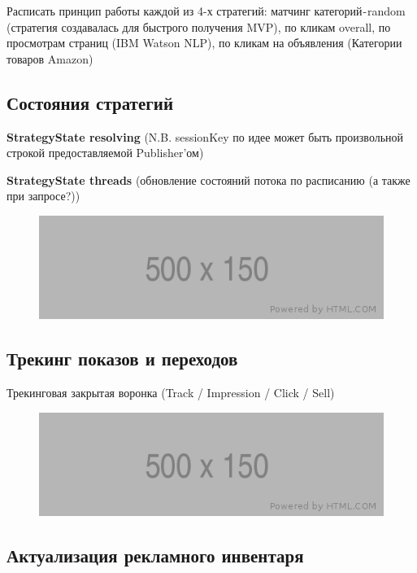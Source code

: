 \documentclass[times]{itmo-student-thesis}
\begin{document}
Расписать принцип работы каждой из 4-х стратегий: матчинг категорий - random (стратегия создавалась для быстрого получения MVP), по кликам overall, по просмотрам страниц (IBM Watson NLP), по кликам на объявления (Категории товаров Amazon)

\subsection{Состояния стратегий}

\textbf{StrategyState resolving} (N.B. sessionKey по идее может быть произвольной строкой предоставляемой Publisher'ом)

\textbf{StrategyState threads} (обновление состояний потока по расписанию (а также при запросе?))

\begin{figure}[h]
\includegraphics[width=\textwidth]{placeholder}
\centering
\end{figure}

\subsection{Трекинг показов и переходов}

Трекинговая закрытая воронка (Track / Impression / Click / Sell)

\begin{figure}[h]
\includegraphics[width=\textwidth]{placeholder}
\centering
\end{figure}

\subsection{Актуализация рекламного инвентаря}
\end{document}
